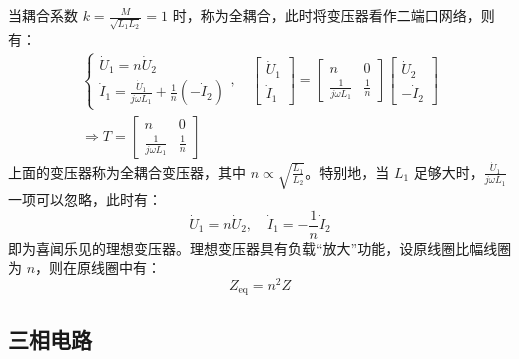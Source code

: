 \documentclass[a4paper]{article}  %
\theoremstyle{MyLineTheoremStyle} %
\theoremstyle{MyBlockTheoremStyle} %
\theoremstyle{MySubsubsectionStyle} %
\begin{document}
\begin{multicols*}{4}
当耦合系数 $k = \frac{M}{\sqrt{L_1 L_2}} = 1$ 时，称为全耦合，此时将变压器看作二端口网络，则有：
\begin{gather}
\begin{cases}
\dot{U}_1 = n \dot{U}_2 \\ 
\dot{I}_1 = \frac{\dot{U}_1}{j \omega L_1} + \frac{1}{n} (- \dot{I}_2)
\end{cases}
,\quad 
\begin{bmatrix}
    \dot{U}_1 \\ \dot{I}_1 
\end{bmatrix}
= 
\begin{bmatrix}
    n & 0 \\ 
    \frac{1}{j \omega L_1} & \frac{1}{n} 
\end{bmatrix}
\begin{bmatrix}
    \dot{U}_2 \\ 
    - \dot{I}_2
\end{bmatrix} \\
\Longrightarrow 
T = 
\begin{bmatrix}
    n & 0 \\ 
    \frac{1}{j \omega L_1} & \frac{1}{n} 
\end{bmatrix}
\end{gather}
上面的变压器称为全耦合变压器，其中 $n \propto \sqrt{\frac{L_1}{L_2}}$。特别地，当 $L_1$ 足够大时，$\frac{\dot{U}_1}{j\omega L_1}$ 一项可以忽略，此时有：
\begin{equation}
    \dot{U}_1 = n \dot{U}_2,\quad \dot{I}_1 =  - \frac{1}{n} \dot{I}_2
\end{equation}
即为喜闻乐见的理想变压器。理想变压器具有负载“放大”功能，设原线圈比幅线圈为 $n$，则在原线圈中有：
\begin{equation}
Z_{\text{eq}} = n^{2} Z
\end{equation}

\subsection{三相电路}




\end{multicols*}
\end{document}
